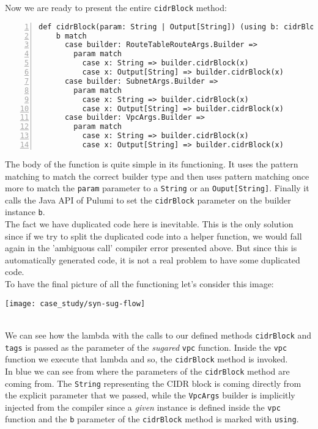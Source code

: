 Now we are ready to present the entire \texttt{cidrBlock} method:\\
\begin{minipage}{\linewidth}
\begin{lstlisting}[numbers=left, numberstyle=\tiny, numbersep=-5pt, stepnumber=1, linewidth=420pt]
  def cidrBlock(param: String | Output[String]) (using b: cidrBlockOwners): Unit =
    b match
      case builder: RouteTableRouteArgs.Builder =>
        param match
          case x: String => builder.cidrBlock(x)
          case x: Output[String] => builder.cidrBlock(x)
      case builder: SubnetArgs.Builder =>
        param match
          case x: String => builder.cidrBlock(x)
          case x: Output[String] => builder.cidrBlock(x)
      case builder: VpcArgs.Builder =>
        param match
          case x: String => builder.cidrBlock(x)
          case x: Output[String] => builder.cidrBlock(x)
\end{lstlisting}
\end{minipage}
The body of the function is quite simple in its functioning.
It uses the pattern matching to match the correct builder type and then uses pattern matching once more to match the \texttt{param} parameter to a \texttt{String} or an \texttt{Ouput[String]}.
Finally it calls the Java API of Pulumi to set the \texttt{cidrBlock} parameter on the builder instance \texttt{b}.\\
The fact we have duplicated code here is inevitable.
This is the only solution since if we try to split the duplicated code into a helper function, we would fall again in the 'ambiguous call' compiler error presented above.
But since this is automatically generated code, it is not a real problem to have some duplicated code.\\
\newline
To have the final picture of all the functioning let's consider this image:
\begin{center}
  \hspace*{-3cm}\texttt{[image: case\_study/syn-sug-flow]} 
\end{center}\mbox{}\\
We can see how the lambda with the calls to our defined methods \texttt{cidrBlock} and \texttt{tags} is passed as the  parameter of the \textit{sugared} \texttt{vpc} function.
Inside the \texttt{vpc} function we execute that lambda and so, the \texttt{cidrBlock} method is invoked.\\
In blue we can see from where the parameters of the \texttt{cidrBlock} method are coming from.
The \texttt{String} representing the CIDR block is coming directly from the explicit parameter that we passed,
while the \texttt{VpcArgs} builder is implicitly injected from the compiler since a \textit{given} instance is defined inside the \texttt{vpc} function and the \texttt{b} parameter of the \texttt{cidrBlock} method is marked with \texttt{using}.

